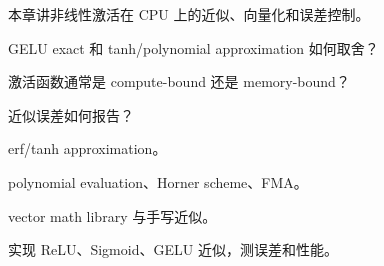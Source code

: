 {本章讲非线性激活在 CPU 上的近似、向量化和误差控制。}
{\item GELU exact 和 tanh/polynomial approximation 如何取舍？
\item 激活函数通常是 compute-bound 还是 memory-bound？
\item 近似误差如何报告？}
{\item erf/tanh approximation。
\item polynomial evaluation、Horner scheme、FMA。
\item vector math library 与手写近似。}
{实现 ReLU、Sigmoid、GELU 近似，测误差和性能。}
